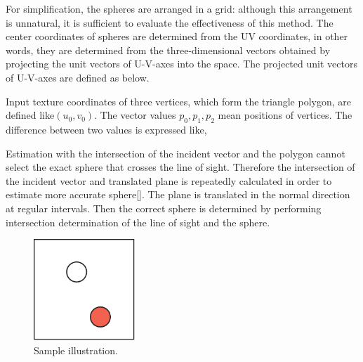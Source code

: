 For simplification, the spheres are arranged in a grid: although this arrangement is unnatural, it is sufficient to evaluate the effectiveness of this method.
The center coordinates of spheres are determined from the UV coordinates, in other words, they are determined from the three-dimensional vectors obtained by projecting the unit vectors of U-V-axes into the space.
The projected unit vectors of U-V-axes are defined as below.




Input texture coordinates of three vertices, which form the triangle polygon, are defined like$(u_0,v_0)$.
The vector values $p_0, p_1, p_2$ mean positions of vertices.
The difference between two values is expressed like,

Estimation with the intersection of the incident vector and the polygon cannot select the exact sphere that crosses the line of sight.
Therefore the intersection of the incident vector and translated plane is repeatedly calculated in order to estimate more accurate sphere\ref{}.
The plane is translated in the normal direction at regular intervals. Then the correct sphere is determined by performing intersection determination of the line of sight and the sphere.
\begin{figure}[ht]
  \centering
  \includegraphics[width=1.5in]{images/samplefigure}
  \caption{Sample illustration.}
\end{figure}

